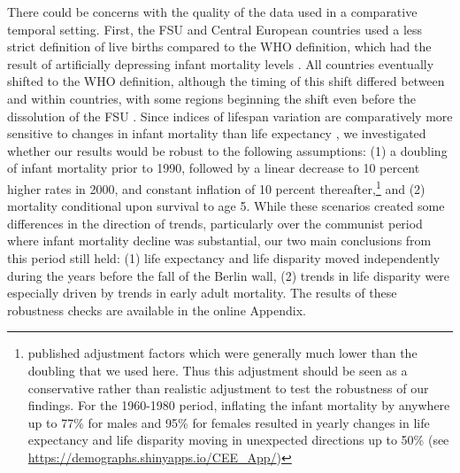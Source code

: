 \documentclass{article}
\begin{document}
\begin{spacing}{1.5}
There could be concerns with the quality of the data used in a comparative temporal setting. First, the FSU and Central European countries used a less strict definition of live births compared to the WHO definition, which had the result of artificially depressing infant mortality levels	 \citep{aleshina2005,unicef2003social}. All countries eventually shifted to the WHO definition, although the timing of this shift differed between and within countries, with some regions beginning the shift even before the dissolution of the FSU \citep{anderson1986infant, aleshina2005, unicef2003social}. Since indices of lifespan variation are comparatively more sensitive to changes in infant mortality than life expectancy \citep{vanraalte2013}, we investigated whether our results would be robust to the following assumptions: (1) a doubling of infant mortality prior to 1990, followed by a linear decrease to 10 percent higher rates in 2000, and constant inflation of 10 percent thereafter,\footnote{\citet{kingkade2001infant} published adjustment factors which were generally much lower than the doubling that we used here. Thus this adjustment should be seen as a conservative rather than realistic adjustment to test the robustness of our findings. For the 1960-1980 period, inflating the infant mortality by anywhere up to 77\% for males and 95\% for females resulted in yearly changes in life expectancy and life disparity moving in unexpected directions up to 50\% (see \url{https://demographs.shinyapps.io/CEE_App/})} and (2) mortality conditional upon survival to age 5. While these scenarios created some differences in the direction of trends, particularly over the communist period where infant mortality decline was substantial, our two main conclusions from this period still held: (1) life expectancy and life disparity moved independently during the years before the fall of the Berlin wall, (2) trends in life disparity were especially driven by trends in early adult mortality. The results of these robustness checks are available in the online Appendix.\\


\end{spacing}
\end{document}
